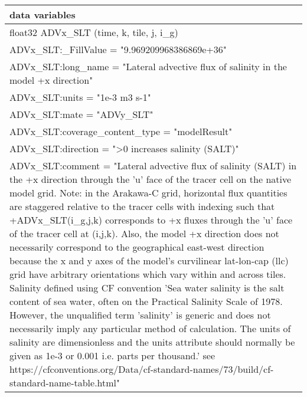 \begin{longtable}{|p{\textwidth}|}
data variables\\
\hline
\hspace{0.5cm}float32 ADVx\_SLT (time, k, tile, j, i\_g)\\
\hspace{0.5cm}\hspace{0.5cm}ADVx\_SLT:\_FillValue = "9.969209968386869e+36"\\
\hspace{0.5cm}\hspace{0.5cm}ADVx\_SLT:long\_name = "Lateral advective flux of salinity in the model +x direction"\\
\hspace{0.5cm}\hspace{0.5cm}ADVx\_SLT:units = "1e-3 m3 s-1"\\
\hspace{0.5cm}\hspace{0.5cm}ADVx\_SLT:mate = "ADVy\_SLT"\\
\hspace{0.5cm}\hspace{0.5cm}ADVx\_SLT:coverage\_content\_type = "modelResult"\\
\hspace{0.5cm}\hspace{0.5cm}ADVx\_SLT:direction = ">0 increases salinity (SALT)"\\
\hspace{0.5cm}\hspace{0.5cm}ADVx\_SLT:comment = "Lateral advective flux of salinity (SALT) in the +x direction through the 'u' face of the tracer cell on the native model grid. Note: in the Arakawa-C grid, horizontal flux quantities are staggered relative to the tracer cells with indexing such that +ADVx\_SLT(i\_g,j,k) corresponds to +x fluxes through the 'u' face of the tracer cell at (i,j,k). Also, the model +x direction does not necessarily correspond to the geographical east-west direction because the x and y axes of the model's curvilinear lat-lon-cap (llc) grid have arbitrary orientations which vary within and across tiles. Salinity defined using CF convention 'Sea water salinity is the salt content of sea water, often on the Practical Salinity Scale of 1978. However, the unqualified term 'salinity' is generic and does not necessarily imply any particular method of calculation. The units of salinity are dimensionless and the units attribute should normally be given as 1e-3 or 0.001 i.e. parts per thousand.' see https://cfconventions.org/Data/cf-standard-names/73/build/cf-standard-name-table.html"\\

\end{longtable}
